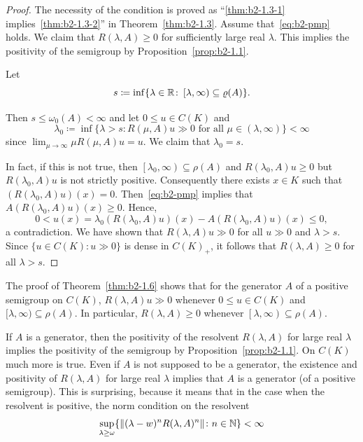 \begin{proof}
The necessity of the condition is proved as 
\enquote{\ref{thm:b2-1.3-1} implies~\ref{thm:b2-1.3-2}} in Theorem~\ref{thm:b2-1.3}.
Assume that~\eqref{eq:b2-pmp} holds.
We claim that $R(\lambda,A) \geq 0$ for sufficiently large real $\lambda$. 
This implies the positivity of the semigroup by Proposition~\ref{prop:b2-1.1}.

Let 
%
\[
	s \coloneq \inf \{\lambda \in \R \colon \left[\lambda,\infty \right) \subseteq \rho(A)\}.
\]
%

Then $s \leq \omega_{0}(A) < \infty$ and let $0 \leq  u \in C(K)$ and  
\[
\lambda_{0} \coloneq \inf \{\lambda > s \colon R(\mu,A)u \gg 0 \text{ for all } \mu \in (\lambda,\infty)\} < \infty
\]
since $\lim_{\mu \to \infty} \mu R(\mu,A)u = u$.
We claim that $\lambda_{0} = s$.

In fact, if this is not true, then $\left[\lambda_{0},\infty\right) \subseteq \rho(A)$ and $R(\lambda_{0},A)u \geq 0$ but $R(\lambda_{0},A)u$ is not strictly positive.
Consequently there exists $x \in K$ such that $(R(\lambda_{0},A)u)(x) = 0$.
Then~\eqref{eq:b2-pmp} implies that $A(R(\lambda_{0},A)u)(x) \geq 0$.
Hence, 
\[
0 < u(x) = \lambda_{0}(R(\lambda_{0},A)u)(x) - A(R(\lambda_{0},A)u)(x) \leq 0,
\]
a contradiction.
We have shown that $R(\lambda,A)u \gg 0$ for all $u \gg 0$ and $\lambda > s$.
Since $\{u \in C(K): u \gg 0\}$ is dense in $C(K)_{+}$, it follows that $R(\lambda,A) \geq 0$ for all $\lambda > s$.
\end{proof}
\begin{remark}\label{rem:b2-1.7}
The proof of Theorem~\ref{thm:b2-1.6} shows that for the generator $A$ of a positive semigroup on $C(K)$, $R(\lambda,A)u \gg 0$ whenever $0 \leq  u \in C(K)$ and $[\lambda,\infty) \subseteq \rho(A)$.
In particular, $R(\lambda,A) \geq 0$ whenever $\left[\lambda,\infty\right) \subseteq \rho(A)$.
\end{remark}
If\/ $A$ is a generator, then the positivity of the resolvent $R(\lambda,A)$ for large real $\lambda$ implies the positivity of the semigroup by Proposition~\ref{prop:b2-1.1}.
On $C(K)$ much more is true.
Even if\/ $A$ is not supposed to be a generator, the existence and positivity of\/ $R(\lambda,A)$ for large real $\lambda$ implies that $A$ is a generator (of a positive semigroup).
This is surprising, because it means that in the case when the resolvent is positive, the norm condition on the resolvent 
\[
\sup_{\lambda \geq \omega} \{\Vert (\lambda-w)^{n}R(\lambda,A)^{n} \Vert \colon n \in \N \} < \infty
\]
